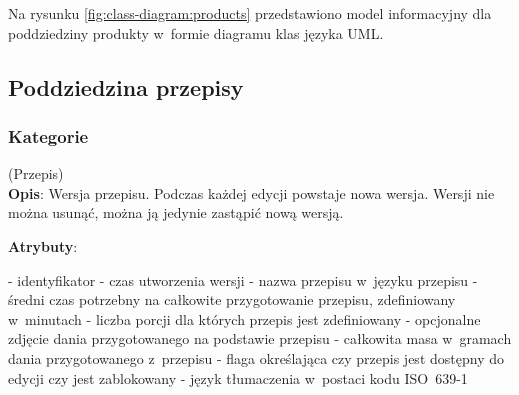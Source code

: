 Na rysunku \ref{fig:class-diagram:products} przedstawiono model informacyjny dla poddziedziny produkty w~formie diagramu klas języka UML.


\subsection{Poddziedzina przepisy}\label{subsec:database:recipes}

\subsubsection{Kategorie}\label{subsubsec:database:recipes:categories}
\begin{enumerate}[label={\textbf{KAT/3/\protect\twodigits{\theenumi}}}, wide, labelwidth=!, labelindent=0pt, labelsep=0pt, series=reqs]
    \setlength\itemsep{1.75em}
    \label{kat:Recipe} (Przepis)\\
    \indent\textbf{Opis}: Wersja przepisu. Podczas każdej edycji powstaje nowa wersja. Wersji nie można usunąć, można ją jedynie zastąpić nową wersją.
    \par
    \textbf{Atrybuty}:
    \begin{itemize}[series=atr, wide, align=left, leftmargin=190pt]
        \label{kat:Recipe:id}- identyfikator
        \label{kat:Recipe:editTimestamp}- czas utworzenia wersji
        \label{kat:Recipe:name}- nazwa przepisu w~języku przepisu
        \label{kat:Recipe:preparationTimeMinutes}- średni czas potrzebny na całkowite przygotowanie przepisu, zdefiniowany w~minutach
        \label{kat:Recipe:numberOfPortions}- liczba porcji dla których przepis jest zdefiniowany
        \label{kat:Recipe:image}- opcjonalne zdjęcie dania przygotowanego na podstawie przepisu
        \label{kat:Recipe:totalGramsWeight}- całkowita masa w~gramach dania przygotowanego z~przepisu
        \label{kat:Recipe:isFinal}- flaga określająca czy przepis jest dostępny do edycji czy jest zablokowany
        \label{kat:Recipe:language}- język tłumaczenia w~postaci kodu ISO~639-1
    \end{itemize}


\end{enumerate}
